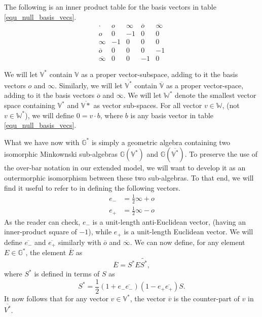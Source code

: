 \documentclass{birkjour}
\theoremstyle{definition}
\theoremstyle{remark}
\numberwithin{equation}{section}
\newcommand{\G}{\mathbb{G}}
\newcommand{\V}{\mathbb{V}}
\newcommand{\W}{\mathbb{W}}
\newcommand{\nvao}{o}
\newcommand{\nvai}{\infty}
\newcommand{\nvaob}{\overline{o}}
\newcommand{\nvaib}{\overline{\infty}}
\newcommand{\eminus}{e_{-}}
\newcommand{\eplus}{e_{+}}
\newcommand{\eminusb}{\overline{e_{-}}}
\newcommand{\eplusb}{\overline{e_{+}}}
\begin{document}
The following is an inner product table for the basis vectors in table \eqref{equ_null_basis_vecs}.
\begin{equation}
\begin{array}{c|cccc}
\cdot & \nvao & \nvai & \nvaob & \nvaib \\
\hline
\nvao & 0 & -1 & 0 & 0 \\
\nvai & -1 & 0 & 0 & 0 \\
\nvaob & 0 & 0 & 0 & -1 \\
\nvaib & 0 & 0 & -1 & 0
\end{array}
\end{equation}

We will let $\V^*$ contain $\V$ as a proper vector-subspace, adding to it the
basis vectors $\nvao$ and $\nvai$.  Similarly, we will let $\overline{\V^*}$ contain
$\overline{\V}$ as a proper vector-space, adding to it the basis vectors $\overline{\nvao}$
and $\overline{\nvai}$.  We will let $\W^*$ denote the smallest vector space containing
$\V^*$ and $\overline{\V*}$ as vector sub-spaces.
For all vector $v\in\W$, (not $v\in\W^*$), we will define $0=v\cdot b$, where
$b$ is any basis vector in table \eqref{equ_null_basis_vecs}.

What we have now with $\G^*$ is simply a geometric algebra containing
two isomorphic Minkownski sub-algebras $\G(\V^*)$ and $\G(\overline{\V^*})$.
To preserve the use of the over-bar notation in our extended model, we will want to develop it
as an outermorphic isomorphism between these two sub-algebras.  To that end, we will
find it useful to refer to \cite{LiRockwood} in defining the following vectors.
\begin{align}
\eminus &= \frac{1}{2}\nvai + \nvao \\
\eplus &= \frac{1}{2}\nvai - \nvao
\end{align}
As the reader can check, $\eminus$ is a unit-length anti-Euclidean vector, (having an inner-product
square of $-1$), while $\eplus$ is a unit-length Euclidean vector.  We will define
$\eminusb$ and $\eplusb$ similarly with $\nvaob$ and $\nvaib$.  We can now
define, for any element $E\in\G^*$, the element $\overline{E}$ as
\begin{equation}
\overline{E} = S^*E\tilde{S^*},
\end{equation}
where $S^*$ is defined in terms of $S$ as
\begin{equation}
S^* = \frac{1}{2}(1+\eminus\eminusb)(1-\eplus\eplusb)S.
\end{equation}
It now follows that for any vector $v\in\V^*$, the vector $\overline{v}$ is the
counter-part of $v$ in $\overline{V^*}$.
\end{document}
